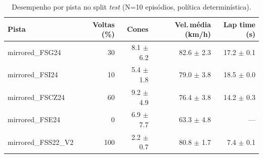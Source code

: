 \begin{table}[H]
\centering
\caption{Desempenho por pista no split \textit{test} (N=10 episódios, política determinística).}
\label{tab:per_track_test}
\begin{tabular}{lrrrr}
\toprule
\textbf{Pista} & \textbf{Voltas (\%)} & \textbf{Cones} & \textbf{Vel.\,m\'edia (km/h)} & \textbf{Lap time (s)} \\
\midrule
mirrored_FSG24 & 30 & 8.1 $\pm$ 6.2 & 82.6 $\pm$ 2.3 & 17.2 $\pm$ 0.1 \\
mirrored_FSI24 & 10 & 5.4 $\pm$ 1.8 & 79.0 $\pm$ 3.8 & 18.5 $\pm$ 0.0 \\
mirrored_FSCZ24 & 60 & 9.2 $\pm$ 4.9 & 76.4 $\pm$ 3.8 & 14.2 $\pm$ 0.3 \\
mirrored_FSE24 & 0 & 6.9 $\pm$ 7.7 & 63.3 $\pm$ 4.8 & --- \\
mirrored_FSS22_V2 & 100 & 2.2 $\pm$ 0.7 & 80.8 $\pm$ 1.7 & 7.4 $\pm$ 0.1 \\
\bottomrule
\end{tabular}
\end{table}
